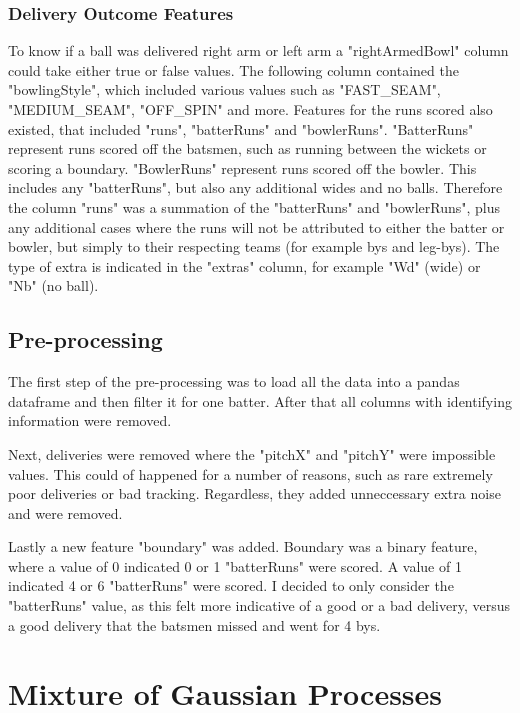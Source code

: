 \documentclass[12pt,a4paper]{report}
\theoremstyle{definition}
\begin{document}
\subsubsection{Delivery Outcome Features}

To know if a ball was delivered right arm or left arm a "rightArmedBowl" column could take either true or false values.
The following column contained the "bowlingStyle", which included various values such as "FAST\_SEAM", "MEDIUM\_SEAM",  "OFF\_SPIN" and more.
Features for the runs scored also existed, that included "runs", "batterRuns" and "bowlerRuns". 
"BatterRuns" represent runs scored off the batsmen, such as running between the wickets or scoring a boundary.
"BowlerRuns" represent runs scored off the bowler. 
This includes any "batterRuns", but also any additional wides and no balls.
Therefore the column "runs" was a summation of the "batterRuns" and "bowlerRuns", plus any additional cases where the runs will not be attributed to either the batter or bowler, but simply to their respecting teams (for example bys and leg-bys).
The type of extra is indicated in the "extras" column, for example "Wd" (wide) or "Nb" (no ball).

\subsection{Pre-processing}

The first step of the pre-processing was to load all the data into a pandas dataframe and then filter it for one batter.
After that all columns with identifying information were removed.

Next, deliveries were removed where the "pitchX" and "pitchY" were impossible values. 
This could of happened for a number of reasons, such as rare extremely poor deliveries or bad tracking.
Regardless, they added unneccessary extra noise and were removed.

Lastly a new feature "boundary" was added. 
Boundary was a binary feature, where a value of 0 indicated 0 or 1 "batterRuns" were scored.
A value of 1 indicated 4 or 6 "batterRuns" were scored. 
I decided to only consider the "batterRuns" value, as this felt more indicative of a good or a bad delivery, versus a good delivery that the batsmen missed and went for 4 bys.

\section{Mixture of Gaussian Processes}
\end{document}

